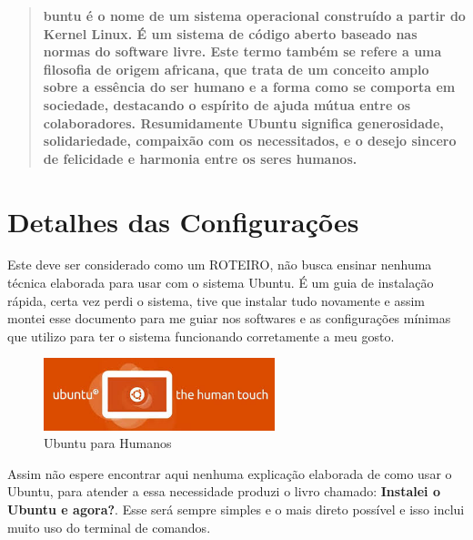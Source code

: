\documentclass[a4paper,11pt]{article}
\begin{document}
	
	\maketitle %
	\thispagestyle{fancy} %
	
\begin{abstract}
\textbf{buntu\cite{ubuntuoficial} é o nome de um sistema operacional construído a partir do Kernel Linux. É um sistema de código aberto baseado nas normas do software livre. Este termo também se refere a uma filosofia de origem africana, que trata de um conceito amplo sobre a essência do ser humano e a forma como se comporta em sociedade, destacando o espírito de ajuda mútua entre os colaboradores. Resumidamente Ubuntu significa generosidade, solidariedade, compaixão com os necessitados, e o desejo sincero de felicidade e harmonia entre os seres humanos.}
\end{abstract}
\vspace{20pt}

\section{Detalhes das Configurações}
Este deve ser considerado como um ROTEIRO, não busca ensinar nenhuma técnica elaborada para usar com o sistema Ubuntu. É um guia de instalação rápida, certa vez perdi o sistema, tive que instalar tudo novamente e assim montei esse documento para me guiar nos softwares e as configurações mínimas que utilizo para ter o sistema funcionando corretamente a meu gosto.
\begin{figure}[H]
	\centering
	\includegraphics[width=0.6\textwidth]{imagens/Ubuntu_Human.jpeg}
	\caption{Ubuntu para Humanos}
\end{figure}

Assim não espere encontrar aqui nenhuma explicação elaborada de como usar o Ubuntu, para atender a essa necessidade produzi o livro chamado: \textbf{Instalei o Ubuntu e agora?}. Esse será sempre simples e o mais direto possível e isso inclui muito uso do terminal de comandos.
\end{document}
